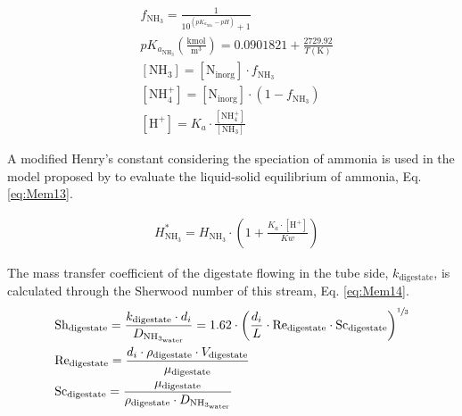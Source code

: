 \begin{refsection}[referencesApD]
\begin{align}
&  f_{\text{NH}_3} = \frac{1}{10^{\left(pK_{a_{\text{NH}_3}}-pH\right)}+1} \label{eq:Mem8} 
\\
&  pK_{a_{\text{NH}_3}} \left(\frac{\text{kmol}}{\text{m}^3}\right) = 0.0901821+\frac{2729.92}{T(\text{K})} \label{eq:Mem11} 
\\
&  \left[{\text{NH}_3}\right] = \left[{\text{N}_\text{inorg}}\right] \cdot f_{\text{NH}_3} \label{eq:Mem9} 
\\
&  \left[{\text{NH}_4^+}\right] = \left[{\text{N}_\text{inorg}}\right] \cdot \left(1-f_{\text{NH}_3}\right) \label{eq:Mem10} 
\\
&  \left[{\text{H}^+}\right] = K_a \cdot \frac{\left[{\text{NH}_4^+}\right]}{\left[{\text{NH}_3}\right]} \label{eq:Mem12} 
\end{align}

A modified Henry's constant considering the speciation of ammonia is used in the model proposed by \citet{rongwong2020modelin} to evaluate the liquid-solid equilibrium of ammonia, Eq. \ref{eq:Mem13}.

\begin{align}
&  H_{\text{NH}_3}^* = H_{\text{NH}_3} \cdot \left(1+\frac{K_a \cdot \left[{\text{H}^+}\right]}{Kw}\right) \label{eq:Mem13}  
\end{align}

The mass transfer coefficient of the digestate flowing in the tube side, $k_{\text{digestate}}$, is calculated through the Sherwood number of this stream, Eq. \ref{eq:Mem14}.
\begin{align}
&  \text{Sh}_{\text{digestate}} = \frac{k_{\text{digestate}} \cdot d_i}{D_{\text{NH}_{3_\text{water}}}} = 1.62 \cdot \left(\frac{d_i}{L} \cdot \text{Re}_{\text{digestate}} \cdot \text{Sc}_{\text{digestate}}\right)^{\sfrac{1}{3}} \label{eq:Mem14}
\\
&  \text{Re}_{\text{digestate}} = \frac{d_i \cdot \rho_{\text{digestate}} \cdot V_{\text{digestate}}}{\mu_{\text{digestate}}} \label{eq:Mem15}
\\
&  \text{Sc}_{\text{digestate}} = \frac{\mu_{\text{digestate}}}{\rho_{\text{digestate}} \cdot D_{\text{NH}_{3_\text{water}}}} \label{eq:Mem16}
\end{align}


\end{refsection}
